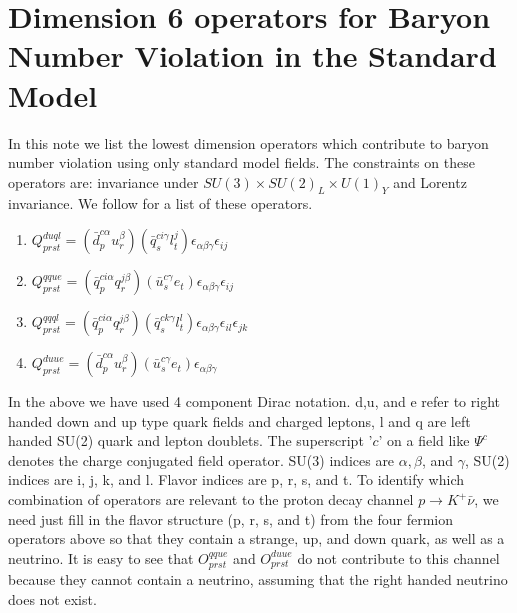 \documentclass[aps,onecolumn,twoside,secnumarabic,balancelastpage,amsmath,amssymb,nofootinbib,hyperref=pdftex]{revtex4}
\begin{document}
\title{}
\author         {Noah Steinberg}
\date{\today}

\maketitle

\section{Dimension 6 operators for Baryon Number Violation in the Standard Model}

In this note we list the lowest dimension operators which contribute to baryon number violation using only standard model fields. The constraints on these operators are: invariance under $SU(3) \times SU(2)_{L} \times U(1)_{Y}$ and Lorentz invariance. We follow \cite{Alonso} for a list of these operators. 

\begin{enumerate}
\item $Q^{duql}_{prst} = (\bar{d}^{c\alpha}_{p}u^{\beta}_{r})(\bar{q}^{ci\gamma}_{s}l^{j}_{t})\epsilon_{\alpha\beta\gamma}\epsilon_{ij}$
\item $Q^{qque}_{prst} = (\bar{q}^{ci\alpha}_{p}q^{j\beta}_{r})(\bar{u}^{c\gamma}_{s}e_{t})\epsilon_{\alpha\beta\gamma}\epsilon_{ij}$
\item $Q^{qqql}_{prst} = (\bar{q}^{ci\alpha}_{p}q^{j\beta}_{r})(\bar{q}^{ck\gamma}_{s}l^{l}_{t})\epsilon_{\alpha\beta\gamma}\epsilon_{il}\epsilon_{jk}$
\item $Q^{duue}_{prst} = (\bar{d}^{c\alpha}_{p}u^{\beta}_{r})(\bar{u}^{c\gamma}_{s}e_{t})\epsilon_{\alpha\beta\gamma}$
\end{enumerate}

In the above we have used 4 component Dirac notation. d,u, and e refer to right handed down and up type quark fields and charged leptons, l and q are left handed SU(2) quark and lepton doublets. The superscript '$c$' on a field like $\Psi^{c}$ denotes the charge conjugated field operator. SU(3) indices are $\alpha, \beta$, and $\gamma$, SU(2) indices are i, j, k, and l. Flavor indices are p, r, s, and t. To identify which combination of operators are relevant to the proton decay channel $p \rightarrow K^{+}\bar{\nu}$, we need just fill in the flavor structure (p, r, s, and t) from the four fermion operators above so that they contain a strange, up, and down quark, as well as a neutrino. It is easy to see that $O^{qque}_{prst}$ and $O^{duue}_{prst}$ do not contribute to this channel because they cannot contain a neutrino, assuming that the right handed neutrino does not exist. 
\end{document}
